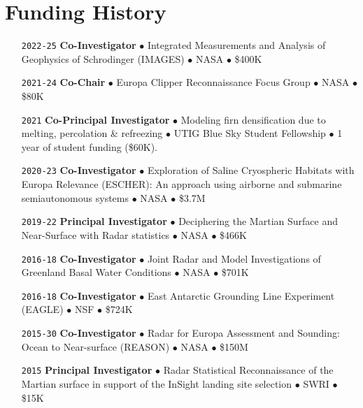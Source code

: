\section*{Funding History}

\begin{itemize}[leftmargin=5.8em, labelsep=1.5em]
    \setlength\itemsep{-.3em}
    
    \item[\texttt{2022-25}] \textbf{Co-Investigator} $\bullet$ Integrated Measurements and Analysis of Geophysics of Schrodinger (IMAGES) $\bullet$ NASA $\bullet$ \$400K
    
    \item[\texttt{2021-24}] \textbf{Co-Chair} $\bullet$ Europa Clipper Reconnaissance Focus Group $\bullet$ NASA $\bullet$ \$80K
    
    \item[\texttt{2021}] \textbf{Co-Principal Investigator} $\bullet$ Modeling firn densification due to melting, percolation \& refreezing $\bullet$ UTIG Blue Sky Student Fellowship $\bullet$ 1 year of student funding (\$60K).
    
    \item[\texttt{2020-23}] \textbf{Co-Investigator} $\bullet$ Exploration of Saline Cryospheric Habitats with Europa Relevance (ESCHER): An approach using airborne and submarine semiautonomous systems $\bullet$ NASA $\bullet$ \$3.7M
    
    \item[\texttt{2019-22}] \textbf{Principal Investigator} $\bullet$ Deciphering the Martian Surface and Near-Surface with Radar statistics $\bullet$ NASA $\bullet$ \$466K
    
    \item[\texttt{2016-18}] \textbf{Co-Investigator} $\bullet$ Joint Radar and Model Investigations of Greenland Basal Water Conditions $\bullet$ NASA $\bullet$ \$701K
    
    \item[\texttt{2016-18}] \textbf{Co-Investigator} $\bullet$ East Antarctic Grounding Line Experiment (EAGLE) $\bullet$ NSF $\bullet$ \$724K
    
    \item[\texttt{2015-30}] \textbf{Co-Investigator} $\bullet$ Radar for Europa Assessment and Sounding: Ocean to Near-surface (REASON) $\bullet$ NASA $\bullet$ \$150M
    
    \item[\texttt{2015}] \textbf{Principal Investigator} $\bullet$ Radar Statistical Reconnaissance of the Martian surface in support of the InSight landing site selection $\bullet$ SWRI $\bullet$ \$15K
    

\end{itemize}
